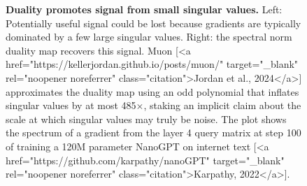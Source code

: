\begin{figure}[t]
    \centering
    \subfloat{
        
    }
    \hspace{0.03\textwidth}
    \subfloat{
        
    }
    \caption{\textbf{Duality promotes signal from small singular values.} Left: Potentially useful signal could be lost because gradients are typically dominated by a few large singular values. Right: the spectral norm duality map recovers this signal. Muon [<a href="https://kellerjordan.github.io/posts/muon/" target="_blank" rel="noopener noreferrer" class="citation">Jordan et al., 2024</a>] approximates the duality map using an odd polynomial that inflates singular values by at most 485$\times$, staking an implicit claim about the scale at which singular values may truly be noise. The plot shows the spectrum of a gradient from the layer 4 query matrix at step 100 of training a 120M parameter NanoGPT on internet text [<a href="https://github.com/karpathy/nanoGPT" target="_blank" rel="noopener noreferrer" class="citation">Karpathy, 2022</a>]. }
    \label{fig:gradient-spectrum}
\end{figure}

